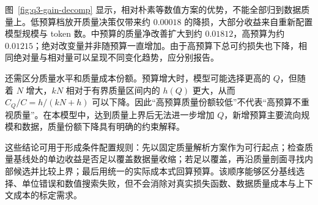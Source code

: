 图~\ref{fig:q3-gain-decomp} 显示，相对朴素等数值方案的优势，不能全部归到数据质量上。低预算档放开质量决策仅带来约 $0.00018$ 的降损，大部分收益来自重新配置模型规模与 token 数。中预算的质量净改善扩大到约 $0.01812$，高预算为约 $0.01215$；绝对改变量并非随预算一直增加。由于高预算下总可约损失也下降，相同绝对量与相对量可以呈现不同变化趋势，应分别报告。

还需区分质量水平和质量成本份额。预算增大时，模型可能选择更高的 $Q$，但随着 $N$ 增大，$kN$ 相对于有界质量区间内的 $h(Q)$ 更大，从而 $C_Q/C=h/(kN+h)$ 可以下降。因此“高预算质量份额较低”不代表“高预算不重视质量”。在本模型中，达到质量上界后无法进一步增加 $Q$，新增预算主要流向规模和数据，质量份额下降具有明确的约束解释。

这些结论可用于形成条件配置规则：先以固定质量解析方案作为可行起点；检查质量基线处的单边收益是否足以覆盖数据量收缩；若足以覆盖，再沿质量剖面寻找内部候选并比较上界；最后用统一的实际成本式回算预算。该顺序能够区分基线选择、单位错误和数值搜索失败，但不会消除对真实损失函数、数据质量成本与上下文成本的标定需求。
